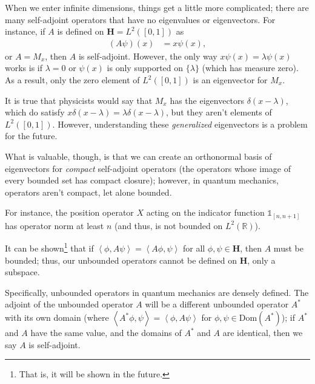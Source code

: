 \documentclass[10pt]{extarticle}
\newcommand{\R}{\mathbb{R}}
\newcommand{\iprod}[2]{\left\langle #1,#2\right\rangle}
\theoremstyle{plain}
\theoremstyle{definition}
\theoremstyle{remark}
\renewcommand{\newline}{\hfill\break}
\begin{document}
  When we enter infinite dimensions, things get a little more complicated; there are many self-adjoint operators that have no eigenvalues or eigenvectors. For instance, if $A$ is defined on $\mathbf{H} = L^{2}([0,1])$ as
  \begin{align*}
    (A\psi)(x) &= x\psi(x),
  \end{align*}
  or $A = M_x$, then $A$ is self-adjoint. However, the only way $x \psi(x) = \lambda \psi(x)$ works is if $\lambda = 0$ or $\psi(x)$ is only supported on $\{\lambda\}$ (which has measure zero). As a result, only the zero element of $L^{2}([0,1])$ is an eigenvector for $M_x$.\newline

  It is true that physicists would say that $M_x$ has the eigenvectors $\delta(x-\lambda)$, which do satisfy $x\delta(x-\lambda) = \lambda\delta(x-\lambda)$, but they aren't elements of $L^{2}([0,1])$. However, understanding these \textit{generalized} eigenvectors is a problem for the future.\newline

  What is valuable, though, is that we can create an orthonormal basis of eigenvectors for \textit{compact} self-adjoint operators (the operators whose image of every bounded set has compact closure); however, in quantum mechanics, operators aren't compact, let alone bounded.\newline

  For instance, the position operator $X$ acting on the indicator function $\mathbb{1}_{[n,n+1]}$ has operator norm at least $n$ (and thus, is not bounded on $L^{2}(\R)$).\newline

  It can be shown\footnote{That is, it will be shown in the future.} that if $\iprod{\phi}{A\psi} = \iprod{A\phi}{\psi}$ for all $\phi,\psi \in \mathbf{H}$, then $A$ must be bounded; thus, our unbounded operators cannot be defined on $\mathbf{H}$, only a subspace.\newline

  Specifically, unbounded operators in quantum mechanics are densely defined. The adjoint of the unbounded operator $A$ will be a different unbounded operator $A^{\ast}$ with its own domain (where $\iprod{A^{\ast}\phi}{\psi} = \iprod{\phi}{A\psi}$ for $\phi,\psi \in \text{Dom}(A^{\ast})$); if $A^{\ast}$ and $A$ have the same value, and the domains of $A^{\ast}$ and $A$ are identical, then we say $A$ is self-adjoint.
\end{document}
